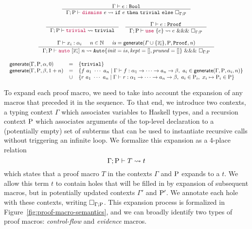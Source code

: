 \begin{figure*}
\begin{minipage}{\textwidth}
\[\begin{array}{c}
  \inference{
    \Gamma \vdash e:\MC{Bool}
  }
  {\Gamma; \Rho
  \vdash
  \macro{dismiss} ~ e
  \expandsTo
  \MC{if} ~ e ~ \MC{then} ~ \MC{trivial} ~ \MC{else} ~ \macroHole{\Gamma}{\Rho}}\\
  \\
  \inference{}{\Gamma; \Rho
  \vdash
  \macro{trivial}
  \expandsTo
  \MC{trivial}} \quad
  \inference{
    \Gamma \vdash e : \MC{Proof}
  }
  {\Gamma; \Rho
  \vdash 
  \macro{use} ~ \{ e \} 
  \expandsTo
  e ~ \MC{\&\&\&} ~ \macroHole{\Gamma}{\Rho}
  }\\
\\  
\inference{\Gamma \vdash x_i:\alpha_i && n \in \mathbb{N} &&
   \mathit{is = \mathsf{generate} (\Gamma \cup \{ \overline{x_i} \}, \Rho, \MC{Proof}, n)}}
            {\Expand{\Gamma}{\Rho}{\macro{auto} ~ [\overline{x_i}] ~ n}
            {\mathtt{Auto} \{ \mathit{init} = is, \mathit{kept} = [], \mathit{pruned} = [] \}~ \MC{\&\&\&} ~ \macroHole{\Gamma}{\Rho}}}
\\[2em]
  \begin{array}{lcl}
    \mathsf{generate}(\Gamma, \Rho, \alpha, 0) &=& \{ \MC{trivial} \}
    \\
    \mathsf{generate}(\Gamma, \Rho, \beta, 1 + n) &=&
      \{ f ~ a_1 ~ \cdots ~ a_n \mid
        \Gamma \vdash f : \alpha_1 \rightarrow \cdots \rightarrow a_n \rightarrow \beta,~
        a_i \in \mathsf{generate}(\Gamma, \Rho, \alpha_i, n)
      \}
      \\ &\cup&
      \{ r ~ a_1 ~ \cdots ~ a_n \mid
        \Gamma \vdash r : \alpha_1 \rightarrow \cdots \rightarrow a_n \rightarrow \beta,~
        a_i \in \Rho_i,~
        x_i \mapsto \Rho_i \in \Rho
      \}
      \\ 
  \end{array}
\end{array} \]
\end{minipage}
\caption{Proof macro semantics}
\label{fig:proof-macro-semantics}
\end{figure*}

To expand each proof macro, we need to take into account the expansion
of any macros that preceded it in the sequence. To that end, we
introduce two contexts, a typing context $\Gamma$ which associates
variables to Haskell types, and a recursion context $\mathrm{P}$ which
associates arguments of the top-level declaration to a (potentially
empty) set of subterms that can be used to instantiate recursive calls
without triggering an infinite loop.  We formalize this expansion as a
4-place relation
\[
\Gamma; \mathrm{P} \vdash T \rightsquigarrow t
\]
which states that a proof macro $T$ in the contexts $\Gamma$ and
$\mathrm{P}$ expands to a \LangBTerm $t$. We allow this term $t$ to contain
holes that will be filled in by expansion of subsequent macros, but in
potentially updated contexts $\Gamma'$ and $\mathrm{P}'$. We annotate each
hole with these contexts, writing $\Box_{\Gamma ; \mathrm{P}}$.  This
expansion process is formalized in
Figure~\ref{fig:proof-macro-semantics}, and we can broadly identify
two types of proof macros: {\em control-flow} and {\em evidence}
macros.

